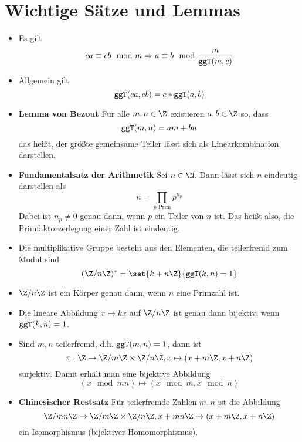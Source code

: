 \section{Wichtige Sätze und Lemmas}
\begin{itemize}
	\item Es gilt
	\begin{equation*}
		ca\equiv cb\mod m\Rightarrow a\equiv b\mod \frac{m}{\texttt{ggT}(m,c)}
	\end{equation*}
	\item Allgemein gilt
	\begin{equation*}
		\texttt{ggT}(ca,cb)=c*\texttt{ggT}(a,b)
	\end{equation*}
	\item \textbf{Lemma von Bezout}
	Für alle $m,n\in\Z$ existieren $a,b\in\Z$ so, dass
	\begin{equation*}
		\texttt{ggT}(m,n)=am+bn
	\end{equation*}
	das heißt, der größte gemeinsame Teiler lässt sich als Linearkombination darstellen.
	\item \textbf{Fundamentalsatz der Arithmetik} Sei $n\in\N$. Dann lässt sich $n$ eindeutig darstellen als
	\begin{equation*}
		n=\prod_{p\text{ Prim}}  p^{n_p}
	\end{equation*}
	Dabei ist $n_p\neq 0$ genau dann, wenn $p$ ein Teiler von $n$ ist. Das heißt also, die Primfaktorzerlegung einer Zahl ist eindeutig.
	\item Die multiplikative Gruppe besteht aus den Elementen, die teilerfremd zum Modul sind
	\begin{equation*}
		(\Z/n\Z)^\ast =\set{k+n\Z}{\ggT(k,n)=1}
	\end{equation*}
	\item $\Z/n\Z$ ist ein Körper genau dann, wenn $n$ eine Primzahl ist.

	\item Die lineare Abbildung $x\mapsto kx$ auf $\Z/n\Z$ ist genau dann bijektiv, wenn $\texttt{ggT}(k,n)=1$.
	
	\item Sind $m,n$ teilerfremd, d.h. $\texttt{ggT}(m,n)=1$, dann ist
	\begin{equation*}
		\pi:\Z\rightarrow\Z/m\Z\times\Z/n\Z, x\mapsto(x+m\Z,x+n\Z)
	\end{equation*}
	surjektiv. Damit erhält man eine bijektive Abbildung
	\begin{equation*}
		(x\mod mn)\mapsto (x\mod m,x\mod n)
	\end{equation*}
	\item \textbf{Chinesischer Restsatz}
	Für teilerfremde Zahlen $m,n$ ist die Abbildung
	\begin{equation*}
		\Z/mn\Z\rightarrow \Z/m\Z\times \Z/n\Z, 
		x+mn\Z\mapsto (x+m\Z,x+n\Z)
	\end{equation*}
	ein Isomorphismus (bijektiver Homomorphismus).


\end{itemize}
